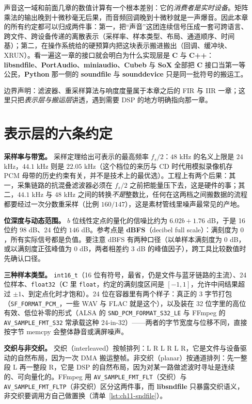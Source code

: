 \documentclass[12pt,a4paper,fontset=fandol]{ctexbook}
\newcommand{\Tp}[1]{\texttt{#1}}
\newcommand{\Bk}{\allowbreak}
\newcommand{\Lib}[1]{\textbf{#1}}
\newcommand{\Lang}[1]{\textsf{\bfseries #1}}
\newcommand{\CL}{\Lang{C}}
\newcommand{\CPP}{\Lang{C++}}
\newcommand{\PY}{\Lang{Python}}
\begin{document}
声音这一域和前面几章的数值计算有一个根本差别：它的\emph{消费者是实时设备}。矩阵乘法的输出晚到十微秒毫无后果，而音频回调晚到十微秒就是一声爆音。因此本章的所有约定都可以归成两件事：第一，把``声音''这团连续信号压成一套可跨语言、跨文件、跨设备传递的离散表示（采样率、样本类型、布局、通道顺序、时间基）；第二，在操作系统给的硬预算内把这块表示搬进搬出（回调、缓冲块、XRUN）。看一遍这一章的接口就会明白为什么实现层是 \CL{} 与 \CPP{}：\Lib{libsndfile}、\Lib{PortAudio}、\Lib{miniaudio}、\Lib{Cubeb} 与 \Lib{SoX} 全部把 \CL{} 接口当第一等公民，\PY{} 那一侧的 \Lib{soundfile} 与 \Lib{sounddevice} 只是同一批符号的搬运工。

边界声明：滤波器、重采样算法与响度度量属于本章之后的 FIR 与 IIR 一章；这里只把\emph{表示层与搬运层}讲透，遇到需要 DSP 的地方明确指向那一章。

\section{表示层的六条约定}

\textbf{采样率与带宽。} 采样定理给出可表示的最高频率 $f_s/2$：$48$ kHz 的名义上限是 $24$ kHz，$44.1$ kHz 则是 $22.05$ kHz（这个档位的来历与 CD 时代用模拟录像机存 PCM 母带的历史约束有关，并不是技术上的最优选）。工程上有两个后果：其一，采集链路的抗混叠滤波器必须在 $f_s/2$ 之前把能量压下去，这是硬件的事；其二，$44.1$ kHz 与 $48$ kHz 之间的转换\emph{不是}整数比，任何在这两档之间搬数据的流程都要经过一次分数重采样（比例 $160/147$），这是素材管线里噪声最常见的产地。

\textbf{位深度与动态范围。} $b$ 位线性定点的量化的信噪比约为 $6.02b + 1.76$ dB，于是 16 位约 $98$ dB、24 位约 $146$ dB。参考点是 \textbf{dBFS}（decibel full scale）：满刻度为 $0$，所有实际信号都是负值。要注意 dBFS 有两种口径（以单样本满刻度为 $0$ dB，或以满刻度正弦峰值为 $0$ dB，两者相差约 $3$ dB 的峰值因子），跨工具比较数值时先确认口径。

\textbf{三种样本类型。} \Tp{int16\_t}（16 位有符号，最省，仍是文件与蓝牙链路的主流）、24 位样本、\Tp{float32}（\CL{} 里 \Tp{float}，约定的满刻度区间是 $[-1,1]$，允许中间结果超过 $\pm 1$、到定点化时才饱和）。24 位在容器里有两个样子：真正的 $3$ 字节打包（\Tp{SF\_\Bk FORMAT\_\Bk PCM\_\Bk 24}，一些 WAV 与 FLAC 就是这个），以及装在 32 位字里的高位有效、低位补零的形式（ALSA 的 \Tp{SND\_\Bk PCM\_\Bk FORMAT\_\Bk S32\_\Bk LE} 与 FFmpeg 的 \Tp{AV\_\Bk SAMPLE\_\Bk FMT\_\Bk S32} 常承载这种 24-in-32）——两者的字节宽度与位移不同，直接按字节 memcpy 会整体静音或满屏噪声。

\textbf{交织与非交织。} 交织（interleaved）按帧排列：L R L R L R，它是文件与设备驱动的自然布局，因为一次 DMA 搬运整帧。非交织（planar）按通道排列：先一整段 L 再一整段 R，它是 DSP 的自然布局，因为对某一路做滤波时寻址是连续的、可向量化的。FFmpeg 用 \Tp{AV\_\Bk SAMPLE\_\Bk FMT\_\Bk FLT}（交织）与 \Tp{AV\_\Bk SAMPLE\_\Bk FMT\_\Bk FLTP}（非交织）区分这两件事，而 \Lib{libsndfile} 只暴露交织语义，非交织要调用方自己做置换（清单~\ref{lst:ch11-sndfile}）。
\end{document}
